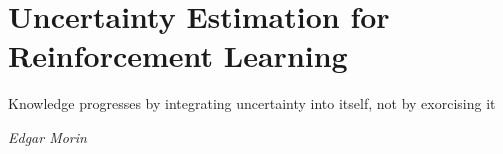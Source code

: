 \chapter{Uncertainty Estimation for Reinforcement Learning}
\label{chap:reinforcement_learning}

\epigraph{Knowledge progresses by integrating uncertainty into itself, not by exorcising it}{\textit{Edgar Morin}}










